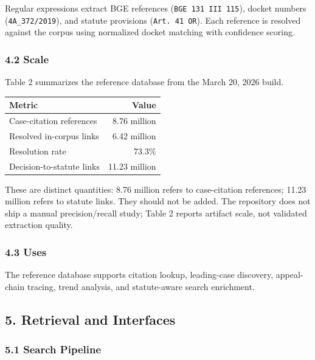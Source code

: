 \documentclass[
  11pt,
]{article}
\newcounter{none} %
\begin{document}
Regular expressions extract BGE references
(\texttt{BGE\ 131\ III\ 115}), docket numbers (\texttt{4A\_372/2019}),
and statute provisions (\texttt{Art.\ 41\ OR}). Each reference is
resolved against the corpus using normalized docket matching with
confidence scoring.

\subsubsection{4.2 Scale}\label{scale}

Table 2 summarizes the reference database from the March 20, 2026 build.

{\def\LTcaptype{none} %
\begin{longtable}[]{@{}lr@{}}
\toprule\noalign{}
Metric & Value \\
\midrule\noalign{}
\endhead
\bottomrule\noalign{}
\endlastfoot
Case-citation references & 8.76 million \\
Resolved in-corpus links & 6.42 million \\
Resolution rate & 73.3\% \\
Decision-to-statute links & 11.23 million \\
\end{longtable}
}

These are distinct quantities: 8.76 million refers to case-citation
references; 11.23 million refers to statute links. They should not be
added. The repository does not ship a manual precision/recall study;
Table 2 reports artifact scale, not validated extraction quality.

\subsubsection{4.3 Uses}\label{uses}

The reference database supports citation lookup, leading-case discovery,
appeal-chain tracing, trend analysis, and statute-aware search
enrichment.

\subsection{5. Retrieval and Interfaces}\label{retrieval-and-interfaces}

\subsubsection{5.1 Search Pipeline}\label{search-pipeline}
\end{document}
